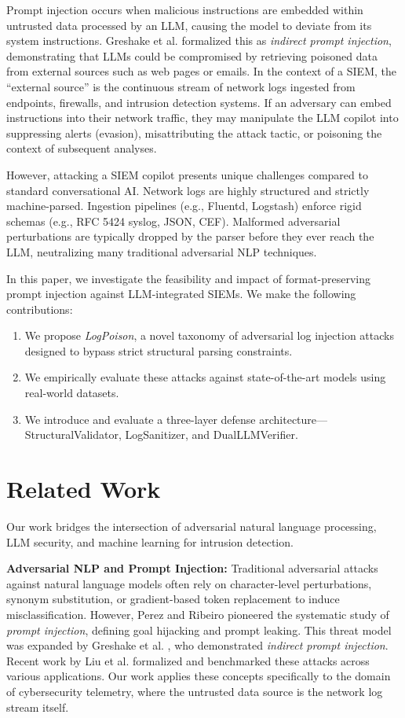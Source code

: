 \documentclass[conference]{IEEEtran}
\begin{document}
Prompt injection occurs when malicious instructions are embedded within untrusted data processed by an LLM, causing the model to deviate from its system instructions. Greshake et al. \cite{greshake2023not} formalized this as \textit{indirect prompt injection}, demonstrating that LLMs could be compromised by retrieving poisoned data from external sources such as web pages or emails. In the context of a SIEM, the ``external source'' is the continuous stream of network logs ingested from endpoints, firewalls, and intrusion detection systems. If an adversary can embed instructions into their network traffic, they may manipulate the LLM copilot into suppressing alerts (evasion), misattributing the attack tactic, or poisoning the context of subsequent analyses.

However, attacking a SIEM copilot presents unique challenges compared to standard conversational AI. Network logs are highly structured and strictly machine-parsed. Ingestion pipelines (e.g., Fluentd, Logstash) enforce rigid schemas (e.g., RFC 5424 syslog, JSON, CEF). Malformed adversarial perturbations are typically dropped by the parser before they ever reach the LLM, neutralizing many traditional adversarial NLP techniques.

In this paper, we investigate the feasibility and impact of format-preserving prompt injection against LLM-integrated SIEMs. We make the following contributions:
\begin{enumerate}
    \item We propose \textit{LogPoison}, a novel taxonomy of adversarial log injection attacks designed to bypass strict structural parsing constraints.
    \item We empirically evaluate these attacks against state-of-the-art models using real-world datasets.
    \item We introduce and evaluate a three-layer defense architecture---StructuralValidator, LogSanitizer, and DualLLMVerifier.
\end{enumerate}

\section{Related Work}
Our work bridges the intersection of adversarial natural language processing, LLM security, and machine learning for intrusion detection.

\textbf{Adversarial NLP and Prompt Injection:} Traditional adversarial attacks against natural language models often rely on character-level perturbations, synonym substitution, or gradient-based token replacement to induce misclassification. However, Perez and Ribeiro \cite{perez2022ignore} pioneered the systematic study of \textit{prompt injection}, defining goal hijacking and prompt leaking. This threat model was expanded by Greshake et al. \cite{greshake2023not}, who demonstrated \textit{indirect prompt injection}. Recent work by Liu et al. \cite{liu2024formalizing} formalized and benchmarked these attacks across various applications. Our work applies these concepts specifically to the domain of cybersecurity telemetry, where the untrusted data source is the network log stream itself.
\end{document}
